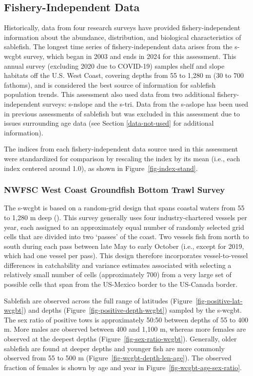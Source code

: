 \documentclass[
  english,
]{article}
\begin{document}
\subsection{Fishery-Independent Data}\label{fishery-independent-data}

Historically, data from four research surveys have provided
fishery-independent information about the abundance, distribution, and
biological characteristics of sablefish. The longest time series of
fishery-independent data arises from the \gls{s-wcgbt} survey, which
began in 2003 and ends in 2024 for this assessment. This annual survey
(excluding 2020 due to COVID-19) samples shelf and slope habitats off
the U.S. West Coast, covering depths from 55 to 1,280 m (30 to 700
fathoms), and is considered the best source of information for sablefish
population trends. This assessment also used data from two additional
fishery-independent surveys: \gls{s-nslope} and the \gls{s-tri}. Data
from the \gls{s-aslope} has been used in previous assessments of
sablefish but was excluded in this assessment due to issues surrounding
age data (see Section \ref{data-not-used} for additional information).

The indices from each fishery-independent data source used in this
assessment were standardized for comparison by rescaling the index by
its mean (i.e., each index centered around 1.0), as shown in
Figure~\ref{fig-index-stand}.

\subsubsection{NWFSC West Coast Groundfish Bottom Trawl
Survey}\label{wcgbt-data}

The \gls{s-wcgbt} is based on a random-grid design that spans coastal
waters from 55 to 1,280 m deep
(). This survey
generally uses four industry-chartered vessels per year, each assigned
to an approximately equal number of randomly selected grid cells that
are divided into two `passes' of the coast. Two vessels fish from north
to south during each pass between late May to early October (i.e.,
except for 2019, which had one vessel per pass). This design therefore
incorporates vessel-to-vessel differences in catchability and variance
estimates associated with selecting a relatively small number of cells
(approximately 700) from a very large set of possible cells that span
from the US-Mexico border to the US-Canada border.

Sablefish are observed across the full range of latitudes
(Figure~\ref{fig-positive-lat-wcgbt}) and depths
(Figure~\ref{fig-positive-depth-wcgbt}) sampled by the \gls{s-wcgbt}.
The sex ratio of positive tows is approximately 50:50 between depths of
55 to 400 m. More males are observed between 400 and 1,100 m, whereas
more females are observed at the deepest depths
(Figure~\ref{fig-sex-ratio-wcgbt}). Generally, older sablefish are found
at deeper depths and younger fish are more commonly observed from 55 to
500 m (Figure~\ref{fig-wcgbt-depth-len-age}). The observed fraction of
females is shown by age and year in
Figure~\ref{fig-wcgbt-age-sex-ratio}.
\end{document}
